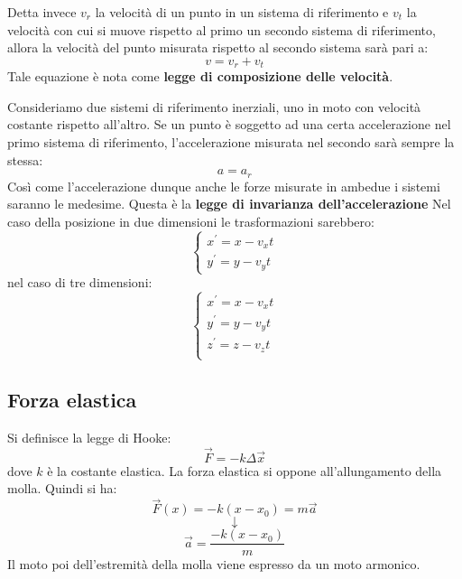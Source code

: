 \documentclass[a4paper,12pt, oneside]{book}
\begin{document}
Detta invece $v_r$ la velocità di un punto in un sistema di riferimento e $v_t$ la velocità con cui si muove rispetto al primo un secondo sistema di riferimento, allora la velocità del punto misurata rispetto al secondo sistema sarà pari a:
$$v=v_r+v_t$$
Tale equazione è nota come \textbf{legge di composizione delle velocità}.


Consideriamo due sistemi di riferimento inerziali, uno in moto con velocità costante rispetto all'altro. Se un punto è soggetto ad una certa accelerazione nel primo sistema di riferimento, l'accelerazione misurata nel secondo sarà sempre la stessa:
$$a=a_r$$
Così come l'accelerazione dunque anche le forze misurate in ambedue i sistemi saranno le medesime. Questa è la \textbf{legge di invarianza dell'accelerazione}
Nel caso della posizione in due dimensioni le trasformazioni sarebbero:
$$\begin{cases}
x^{'}=x-v_xt\\
y^{'}=y-v_yt
\end{cases}$$
nel caso di tre dimensioni:
$$\begin{cases}
x^{'}=x-v_xt\\
y^{'}=y-v_yt\\
z^{'}=z-v_zt\\
\end{cases}$$

\subsection{Forza elastica}
Si definisce la legge di Hooke:
$$\vec{F}=-k\Delta \vec{x}$$
dove $k$ è la costante elastica. La forza elastica si oppone all'allungamento della molla. Quindi si ha:
$$\vec{F}(x)=-k(x-x_0)=m\vec{a}$$
$$\downarrow$$
$$\vec{a}=\frac{-k(x-x_0)}{m}$$
Il moto poi dell'estremità della molla viene espresso da un moto armonico.
\end{document}
